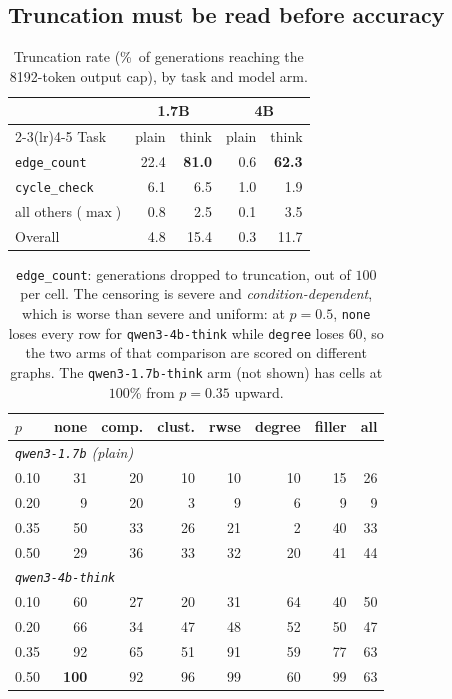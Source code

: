 \documentclass[11pt]{article}
\begin{document}
\subsection{Truncation must be read before accuracy}
\label{sec:results-truncation}

\begin{table}[t]
\centering
\small
\begin{tabular}{lrrrr}
\toprule
& \multicolumn{2}{c}{1.7B} & \multicolumn{2}{c}{4B} \\
\cmidrule(lr){2-3}\cmidrule(lr){4-5}
Task & plain & think & plain & think \\
\midrule
\texttt{edge\_count}     & 22.4 & \textbf{81.0} & 0.6 & \textbf{62.3} \\
\texttt{cycle\_check}    &  6.1 &  6.5 & 1.0 &  1.9 \\
all others ($\max$)      &  0.8 &  2.5 & 0.1 &  3.5 \\
\midrule
Overall                  &  4.8 & 15.4 & 0.3 & 11.7 \\
\bottomrule
\end{tabular}
\caption{Truncation rate (\%~of generations reaching the 8192-token output
cap), by task and model arm.}
\label{tab:hitcap}
\end{table}

\begin{table}[t]
\centering
\footnotesize
\setlength{\tabcolsep}{3.4pt}
\begin{tabular}{lrrrrrrr}
\toprule
$p$ & none & comp. & clust. & rwse & degree & filler & all \\
\midrule
\multicolumn{8}{l}{\emph{\texttt{qwen3-1.7b} (plain)}} \\
0.10 & 31 & 20 & 10 & 10 & 10 & 15 & 26 \\
0.20 &  9 & 20 &  3 &  9 &  6 &  9 &  9 \\
0.35 & 50 & 33 & 26 & 21 &  2 & 40 & 33 \\
0.50 & 29 & 36 & 33 & 32 & 20 & 41 & 44 \\
\midrule
\multicolumn{8}{l}{\emph{\texttt{qwen3-4b-think}}} \\
0.10 &  60 & 27 & 20 & 31 & 64 & 40 & 50 \\
0.20 &  66 & 34 & 47 & 48 & 52 & 50 & 47 \\
0.35 &  92 & 65 & 51 & 91 & 59 & 77 & 63 \\
0.50 & \textbf{100} & 92 & 96 & 99 & 60 & 99 & 63 \\
\bottomrule
\end{tabular}
\caption{\texttt{edge\_count}: generations dropped to truncation, out of
$100$ per cell. The censoring is severe and \emph{condition-dependent},
which is worse than severe and uniform: at $p{=}0.5$, \texttt{none} loses
every row for \texttt{qwen3-4b-think} while \texttt{degree} loses $60$, so
the two arms of that comparison are scored on different graphs. The
\texttt{qwen3-1.7b-think} arm (not shown) has cells at $100\%$ from
$p{=}0.35$ upward.}
\label{tab:hitcap-detail}
\end{table}
\end{document}
